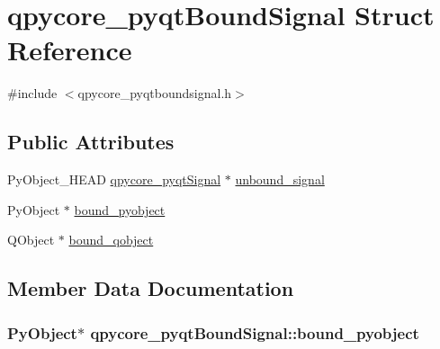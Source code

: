 \hypertarget{structqpycore__pyqtBoundSignal}{}\section{qpycore\+\_\+pyqt\+Bound\+Signal Struct Reference}
\label{structqpycore__pyqtBoundSignal}


{\ttfamily \#include $<$qpycore\+\_\+pyqtboundsignal.\+h$>$}

\subsection*{Public Attributes}
\begin{DoxyCompactItemize}
\item 
Py\+Object\+\_\+\+H\+E\+A\+D \hyperlink{qpycore__pyqtsignal_8h_aedecc3e4789fbc96051ae3f13a454ff7}{qpycore\+\_\+pyqt\+Signal} $\ast$ \hyperlink{structqpycore__pyqtBoundSignal_afd50b3d18fc8f9c39d524527a9a663c8}{unbound\+\_\+signal}
\item 
Py\+Object $\ast$ \hyperlink{structqpycore__pyqtBoundSignal_a0babf03367a5e0f648726c56a7a6fabd}{bound\+\_\+pyobject}
\item 
Q\+Object $\ast$ \hyperlink{structqpycore__pyqtBoundSignal_a2ca5dffd4767281ad913274f3c3714fe}{bound\+\_\+qobject}
\end{DoxyCompactItemize}


\subsection{Member Data Documentation}
\hypertarget{structqpycore__pyqtBoundSignal_a0babf03367a5e0f648726c56a7a6fabd}{}
\subsubsection[{bound\+\_\+pyobject}]{\setlength{\rightskip}{0pt plus 5cm}Py\+Object$\ast$ qpycore\+\_\+pyqt\+Bound\+Signal\+::bound\+\_\+pyobject}\label{structqpycore__pyqtBoundSignal_a0babf03367a5e0f648726c56a7a6fabd}
\hypertarget{structqpycore__pyqtBoundSignal_a2ca5dffd4767281ad913274f3c3714fe}{}
